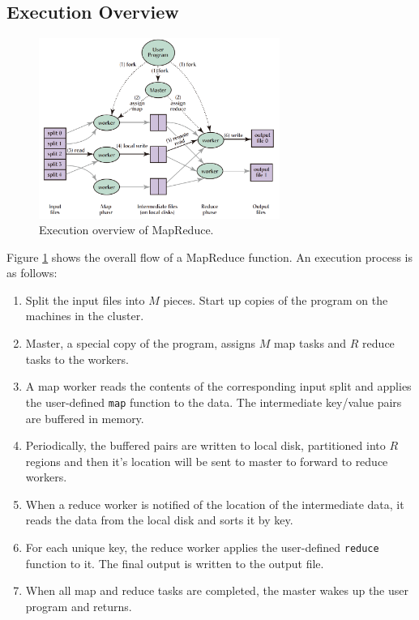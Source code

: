 \documentclass[10pt]{article}
\begin{document}
\subsection{Execution Overview}

\begin{figure}
\centering
\includegraphics[width=0.7\textwidth]{img/1.png}
\caption{Execution overview of MapReduce.}
\label{fig:overview}
\end{figure}

Figure \ref{fig:overview} shows the overall flow of a MapReduce function. An execution process is as follows:

\begin{enumerate}
    \item Split the input files into $M$ pieces. Start up copies of the program on the machines in the cluster.
    \item Master, a special copy of the program, assigns $M$ map tasks and $R$ reduce tasks to the workers.
    \item A map worker reads the contents of the corresponding input split and applies the user-defined \texttt{map} function to the data. The intermediate key/value pairs are buffered in memory.
    \item Periodically, the buffered pairs are written to local disk, partitioned into $R$ regions and then it's location will be sent to master to forward to reduce workers.
    \item When a reduce worker is notified of the location of the intermediate data, it reads the data from the local disk and sorts it by key.
    \item For each unique key, the reduce worker applies the user-defined \texttt{reduce} function to it. The final output is written to the output file.
    \item When all map and reduce tasks are completed, the master wakes up the user program and returns.
\end{enumerate}
\end{document}
